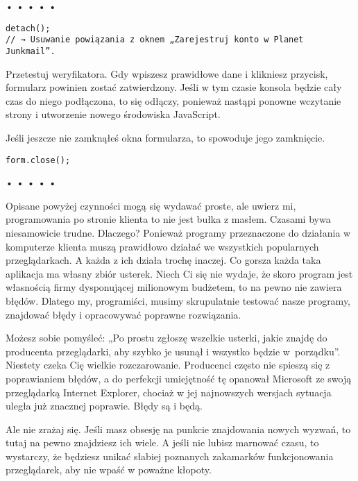 \begin{center}
• • • • •
\end{center}

  
\begin{verbatim} 
detach();
// → Usuwanie powiązania z oknem „Zarejestruj konto w Planet Junkmail”.
\end{verbatim}
  
Przetestuj weryfikatora. Gdy wpiszesz prawidłowe dane i klikniesz przycisk, formularz powinien zostać zatwierdzony. Jeśli w tym czasie konsola będzie cały czas do niego podłączona, to się odłączy, ponieważ nastąpi ponowne wczytanie strony i utworzenie nowego środowiska JavaScript.

  
Jeśli jeszcze nie zamknąłeś okna formularza, to spowoduje jego zamknięcie.

  
\begin{verbatim} 
form.close();
\end{verbatim}


\begin{center}
• • • • •
\end{center}

  
Opisane powyżej czynności mogą się wydawać proste, ale uwierz mi, programowania po stronie klienta to nie jest bułka z masłem. Czasami bywa niesamowicie trudne. Dlaczego? Ponieważ programy przeznaczone do działania w komputerze klienta muszą prawidłowo działać we wszystkich popularnych przeglądarkach. A każda z ich działa trochę inaczej. Co gorsza każda taka aplikacja ma własny zbiór usterek. Niech Ci się nie wydaje, że skoro program jest własnością firmy dysponującej milionowym budżetem, to na pewno nie zawiera błędów. Dlatego my, programiści, musimy skrupulatnie testować nasze programy, znajdować błędy i opracowywać poprawne rozwiązania.

  
Możesz sobie pomyśleć: „Po prostu zgłoszę wszelkie usterki, jakie znajdę do producenta przeglądarki, aby szybko je usunął i wszystko będzie w~porządku”. Niestety czeka Cię wielkie rozczarowanie. Producenci często nie spieszą się z poprawianiem błędów, a do perfekcji umiejętność tę opanował Microsoft ze swoją przeglądarką Internet Explorer, chociaż w jej najnowszych wersjach sytuacja uległa już znacznej poprawie. Błędy są i będą.

  
Ale nie zrażaj się. Jeśli masz obsesję na punkcie znajdowania nowych wyzwań, to tutaj na pewno znajdziesz ich wiele. A jeśli nie lubisz marnować czasu, to wystarczy, że będziesz unikać słabiej poznanych zakamarków funkcjonowania przeglądarek, aby nie wpaść w poważne kłopoty.